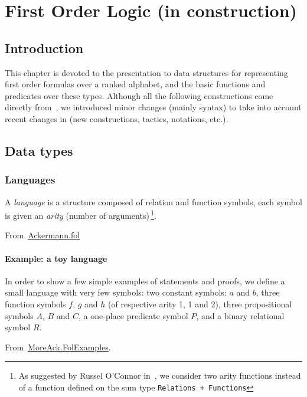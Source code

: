 \chapter{First Order Logic (in construction)}
\label{chap:fol}

\section{Introduction}

This chapter is devoted to the presentation to  data structures for representing first order formulas over a ranked alphabet, and the basic functions and predicates over these types.
Although all the following constructions come directly from~\cite{Goedel}, we introduced minor changes (mainly syntax) to
take into account recent changes in \coq(new constructions, tactics, notations, etc.).


\section{Data types}

\subsection{Languages}

A \emph{language} is a structure composed of relation and function symbols, each symbol is given an \emph{arity} (number of arguments)\,\footnote{As suggested by Russel O'Connor in~\cite{OConnor05}, we consider two arity functions instead of a function defined on the sum type \texttt{Relations + Functions}}.

From~\href{../theories/html/hydras.Ackermann.fol.html}{Ackermann.fol}


\subsubsection{Example: a toy language}
In order to show a few simple examples of statements and proofs, we define a small language with very few symbols:
two constant symbols: $a$ and $b$, three function symbols $f$, $g$ and $h$  (of respective arity 1, 1 and 2), three propositional symbols $A$, $B$ and $C$, a one-place predicate symbol $P$, and a binary relational symbol $R$. 
 
From~\href{../theories/html/hydras.MoreAck.FolExamples.html}{MoreAck.FolExamples}.



